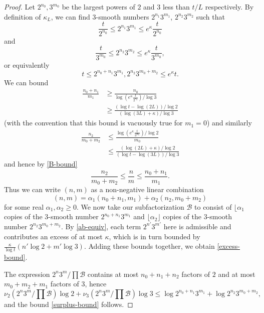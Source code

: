\documentclass[12pt,a4paper,reqno]{amsart}
\numberwithin{equation}{section}
\theoremstyle{plain}
\theoremstyle{definition}
\newcommand\tuple{{\mathcal B}}
\begin{document}
\begin{proof}  Let $2^{n_0}, 3^{m_0}$ be the largest powers of $2$ and $3$ less than $t/L$ respectively.  By definition of $\kappa_L$, we can find $3$-smooth numbers $2^{n_1} 3^{m_1}$, $2^{n_2} 3^{m_2}$  such that
\begin{equation}\label{ab} 
  \frac{t}{2^{n_0}} \leq 2^{n_1} 3^{m_1} \leq e^{\kappa} \frac{t}{2^{n_0}}
\end{equation}
and
\begin{equation}\label{ab-2}
 \frac{t}{3^{m_0}} \leq 2^{n_2} 3^{m_2} \leq e^{\kappa} \frac{t}{3^{m_0}},
\end{equation}
or equivalently
\begin{equation}\label{ab-equiv} 
  t \leq 2^{n_0+n_1} 3^{m_1}, 2^{n_2} 3^{m_0+m_2} \leq e^{\kappa} t.
\end{equation}
We can bound
\begin{align*}
  \frac{n_0 + n_1}{m_1} &\geq \frac{n_0}{\log (e^{\kappa} \frac{t}{2^{n_0}}) / \log 3} \\
  &\geq \frac{(\log t - \log(2L)) / \log 2}{ (\log(3L)+\kappa) / \log 3 }
\end{align*}
(with the convention that this bound is vacuously true for $m_1=0$) and similarly
\begin{align*}
  \frac{n_2}{m_0+m_2} &\leq \frac{\log(e^\kappa \frac{t}{3^{m_0}}) / \log 2}{m_0} \\
  &\leq \frac{(\log(2L)+\kappa)/\log 2}{(\log t-\log(3L))/\log 3}
\end{align*}
and hence by \eqref{B-bound}
\begin{equation}\label{m-wedge} \frac{n_2}{m_0+m_2} \leq \frac{n}{m} \leq \frac{n_0+n_1}{m_1}.
\end{equation}
Thus we can write $(n,m)$ as a non-negative linear combination
$$ (n,m) = \alpha_1 (n_0+n_1,m_1) + \alpha_2 (n_2,m_0+m_2)$$
for some real $\alpha_1, \alpha_2 \geq 0$. We now take our subfactorization $\tuple$ to consist of $\lfloor \alpha_1$ copies of the $3$-smooth number $2^{n_0+n_1} 3^{m_1}$ and $\lfloor \alpha_2 \rfloor$ copies of the $3$-smooth number $2^{n_2} 3^{m_0+m_2}$.  By \eqref{ab-equiv}, each term $2^{n'} 3^{m'}$ here is admissible and contributes an excess of at most $\kappa$, which is in turn bounded by $\frac{\kappa}{\log t} (n' \log 2 + m' \log 3)$.  Adding these bounds together, we obtain \eqref{excess-bound}.

The expression $2^n 3^m / \prod \tuple$ contains at most $n_0+n_1+n_2$ factors of $2$ and at most $m_0+m_2+m_1$ factors of $3$, hence
$$ \nu_2(2^n 3^m / \prod \tuple) \log 2 +
\nu_3(2^n 3^m / \prod \tuple) \log 3
\leq \log 2^{n_0+n_1} 3^{m_1} + \log 2^{n_2} 3^{m_0+m_2},$$
and the bound \eqref{surplus-bound} follows.
\end{proof}
\end{document}
